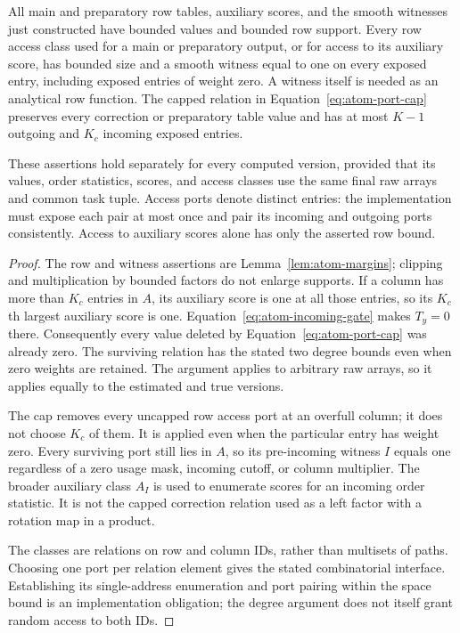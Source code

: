 \begin{lemma}
\label{lem:atom-ports}
All main and preparatory row tables, auxiliary scores, and the smooth
witnesses just constructed have bounded values and bounded row support.
Every row access class used for a main or preparatory output, or for
access to its auxiliary score, has bounded size and a smooth witness
equal to one on every exposed entry, including exposed entries of weight
zero.  A witness itself is needed as an analytical row function. The capped relation in Equation~\eqref{eq:atom-port-cap}
preserves every correction or preparatory table value and has at most
$K-1$ outgoing and $K_c$ incoming exposed entries.

These assertions hold separately for every computed version, provided
that its values, order statistics, scores, and access classes use the same final
raw arrays and common task tuple.  Access ports denote distinct entries:
the implementation must expose each pair at most once and pair its
incoming and outgoing ports consistently.  Access to auxiliary scores
alone has only the asserted row bound.
\end{lemma}

\begin{proof}
The row and witness assertions are Lemma~\ref{lem:atom-margins}; clipping
and multiplication by bounded factors do not enlarge supports.
If a column has more than $K_c$ entries in $A$, its auxiliary score is
one at all those entries, so its $K_c$th largest auxiliary score is one.
Equation~\eqref{eq:atom-incoming-gate} makes $T_y=0$ there.  Consequently
every value deleted by Equation~\eqref{eq:atom-port-cap} was already zero.
The surviving relation has the stated two degree bounds even when zero
weights are retained.  The argument applies to arbitrary raw arrays, so
it applies equally to the estimated and true versions.

The cap removes every uncapped row access port at an overfull column; it does
not choose $K_c$ of them.  It is applied even when the particular entry
has weight zero.  Every surviving port still lies in $A$, so its
pre-incoming witness $I$ equals one regardless of a zero usage mask,
incoming cutoff, or column multiplier.  The broader auxiliary class
$A_I$ is used to enumerate scores for an incoming order statistic.  It is not the
capped correction relation used as a left factor with a rotation map in a product.

The classes are relations on row and column IDs, rather than multisets
of paths.  Choosing one port per relation element gives the stated
combinatorial interface.  Establishing its single-address enumeration
and port pairing within the space bound is an implementation obligation;
the degree argument does not itself grant random access to both IDs.
\end{proof}

